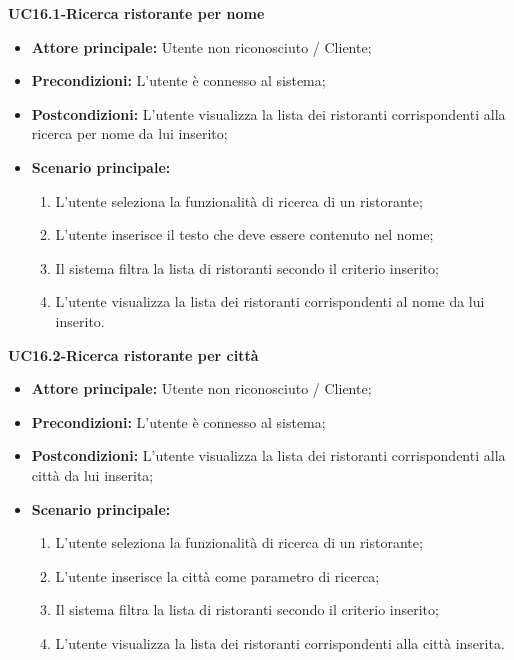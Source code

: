 \pagebreak
\textbf{UC16.1-Ricerca ristorante per nome}
\begin{itemize}
\item \textbf{Attore principale:} Utente non riconosciuto / Cliente;
\item \textbf{Precondizioni:} L'utente è connesso al sistema;
\item \textbf{Postcondizioni:} L'utente visualizza la lista dei ristoranti corrispondenti alla ricerca per nome da lui inserito;
\item \textbf{Scenario principale:}
\begin{enumerate}
    \item L'utente seleziona la funzionalità di ricerca di un ristorante;
    \item L'utente inserisce il testo che deve essere contenuto nel nome;
    \item Il sistema filtra la lista di ristoranti secondo il criterio inserito;
    \item L'utente visualizza la lista dei ristoranti corrispondenti al nome da lui inserito.
\end{enumerate}
\end{itemize}

\textbf{UC16.2-Ricerca ristorante per città}
\begin{itemize}
\item \textbf{Attore principale:} Utente non riconosciuto / Cliente;
\item \textbf{Precondizioni:} L'utente è connesso al sistema;
\item \textbf{Postcondizioni:} L'utente visualizza la lista dei ristoranti corrispondenti alla città da lui inserita;
\item \textbf{Scenario principale:}
\begin{enumerate}
    \item L'utente seleziona la funzionalità di ricerca di un ristorante;
    \item L'utente inserisce la città come parametro di ricerca;
    \item Il sistema filtra la lista di ristoranti secondo il criterio inserito;
    \item L'utente visualizza la lista dei ristoranti corrispondenti alla città inserita.
\end{enumerate}
\end{itemize}

